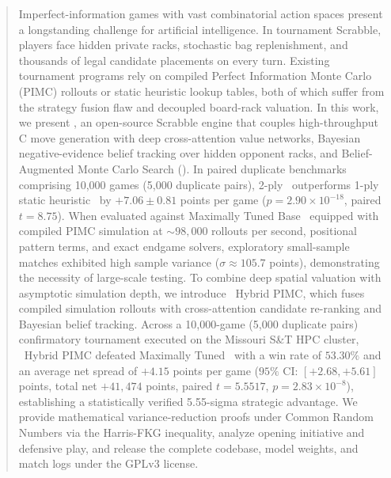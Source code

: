 \begin{abstract}
Imperfect-information games with vast combinatorial action spaces present a longstanding challenge for artificial intelligence. In tournament Scrabble, players face hidden private racks, stochastic bag replenishment, and thousands of legal candidate placements on every turn. Existing tournament programs rely on compiled Perfect Information Monte Carlo (PIMC) rollouts or static heuristic lookup tables, both of which suffer from the strategy fusion flaw and decoupled board-rack valuation. In this work, we present \algo, an open-source Scrabble engine that couples high-throughput C move generation with deep cross-attention value networks, Bayesian negative-evidence belief tracking over hidden opponent racks, and Belief-Augmented Monte Carlo Search (\bams). In paired duplicate benchmarks comprising 10,000 games (5,000 duplicate pairs), 2-ply \bams\ outperforms 1-ply static heuristic \magpie\ by $+7.06 \pm 0.81$ points per game ($p = 2.90 \times 10^{-18}$, paired $t = 8.75$). When evaluated against Maximally Tuned Base \magpie\ equipped with compiled PIMC simulation at $\sim 98,000$ rollouts per second, positional pattern terms, and exact endgame solvers, exploratory small-sample matches exhibited high sample variance ($\sigma \approx 105.7$ points), demonstrating the necessity of large-scale testing. To combine deep spatial valuation with asymptotic simulation depth, we introduce \algo\ Hybrid PIMC, which fuses compiled simulation rollouts with cross-attention candidate re-ranking and Bayesian belief tracking. Across a 10,000-game (5,000 duplicate pairs) confirmatory tournament executed on the Missouri S\&T HPC cluster, \algo\ Hybrid PIMC defeated Maximally Tuned \magpie\ with a win rate of $53.30\%$ and an average net spread of $+4.15$ points per game ($95\%$ CI: $[+2.68, +5.61]$ points, total net $+41,474$ points, paired $t = 5.5517$, $p = 2.83 \times 10^{-8}$), establishing a statistically verified 5.55-sigma strategic advantage. We provide mathematical variance-reduction proofs under Common Random Numbers via the Harris-FKG inequality, analyze opening initiative and defensive play, and release the complete codebase, model weights, and match logs under the GPLv3 license.
\end{abstract}
